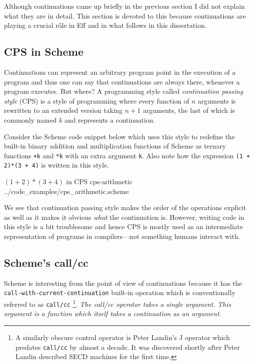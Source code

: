 \documentclass[class=article, crop=false]{standalone}
\begin{document}
Although continuations came up briefly in the previous section I did not
explain what they are in detail. This section is devoted to this because
continuations are playing a crucial rôle in Eff and in what follows in this
dissertation.

\subsection{CPS in Scheme}
\lstset{language=scheme}

Continuations can represent an arbitrary program point in the execution of a
program and thus one can say that continuations are always there, whenever a
program executes. But where? A programming style called \emph{continuation
passing style} (CPS) is a style of programming where every function of $n$
arguments is rewritten to an extended version taking $n+1$ arguments, the last
of which is commonly named $k$ and represents a continuation.

Consider the Scheme code snippet below which uses this style to redefine the
built-in binary addition and multiplication functions of Scheme as ternary
functions \lstinline|+k| and \lstinline|*k| with an extra argument \verb|k|.
Also note how the expression \lstinline|(1 + 2)*(3 + 4)| is written in this
style.

{$(1+2) * (3+4)$ in CPS}
{cps-arithmetic}
{../code_examples/cps_arithmetic.scheme}

We see that continuation passing style makes the order of the operations
explicit as well as it makes it obvious \emph{what} the continuation is.
However, writing code in this style is a bit troublesome and hence CPS is mostly
used as an intermediate representation of programs in compilers---not
something humans interact with.

\subsection{Scheme's call/cc}

Scheme is interesting from the point of view of continuations because it has the
\lstinline|call-with-current-continuation| built-in operation which is
conventionally referred to as \lstinline|call/cc|
\footnote{A similarly obscure control operator is Peter Landin's J operator
which predates \lstinline{call/cc} by almost a decade. It was discovered shortly
after Peter Landin described SECD machines for the first time.}.
\emph{The call/cc operator takes a single argument. This argument is a function
which itself takes a continuation as an argument.}
\end{document}
